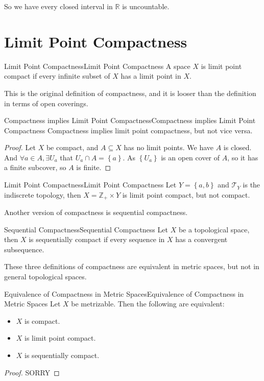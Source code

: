\documentclass[../main.tex]{subfiles}
\begin{document}
So we have every closed interval in $\mathbb{R}$ is uncountable.

\section{Limit Point Compactness}

\begin{definition}{Limit Point Compactness}{Limit Point Compactness}
A space $X$ is limit point compact if every infinite subset of $X$ has a limit point in $X$.
\end{definition}

This is the original definition of compactness, and it is looser than the definition in terms of open coverings.

\begin{theorem}{Compactness implies Limit Point Compactness}{Compactness implies Limit Point Compactness}
Compactness implies limit point compactness, but not vice versa.
\end{theorem}
\begin{proof}
	Let $X$ be compact, and $A \subseteq X$ has no limit points. We have $A$ is closed. And $\forall a\in A,\exists U_a$ that $U_a\cap A = \left\{ a \right\}$. As $\left\{ U_a \right\}$ is an open cover of $A$, so it has a finite subcover, so $A$ is finite.
\end{proof}

\begin{example}{Limit Point Compactness}{Limit Point Compactness}
	Let $Y = \left\{ a,b \right\}$ and $\mathcal{T}_Y$ is the indiscrete topology, then $X = \mathbb{Z}_+ \times Y$ is limit point compact, but not compact.
\end{example}

Another version of compactness is sequential compactness.

\begin{definition}{Sequential Compactness}{Sequential Compactness}
Let $X$ be a topological space, then $X$ is sequentially compact if every sequence in $X$ has a convergent subsequence.
\end{definition}

These three definitions of compactness are equivalent in metric spaces, but not in general topological spaces.

\begin{theorem}{Equivalence of Compactness in Metric Spaces}{Equivalence of Compactness in Metric Spaces}
Let $X$ be metrizable. Then the following are equivalent:
\begin{itemize}
	\item $X$ is compact.
	\item $X$ is limit point compact.
	\item $X$ is sequentially compact.
\end{itemize}
\end{theorem}
\begin{proof}
SORRY
\end{proof}
\end{document}
